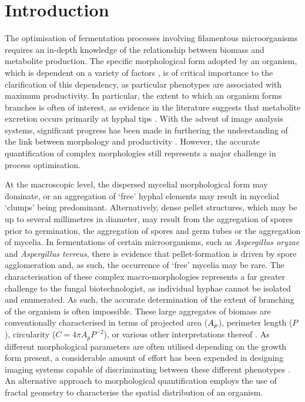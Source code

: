 \section{Introduction}

The optimisation of fermentation processes involving filamentous microorganisms requires an in-depth knowledge of the relationship between biomass and metabolite production. The specific morphological form adopted by an organism, which is dependent on a variety of factors \cite{znidarsic2001}, is of critical importance to the clarification of this dependency, as particular phenotypes are associated with maximum productivity. In particular, the extent to which an organism forms branches is often of interest, as evidence in the literature suggests that metabolite excretion occurs primarily at hyphal tips \cite{gordon2000,muller2002}. With the advent of image analysis systems, significant progress has been made in furthering the understanding of the link between morphology and productivity \cite{papagianni2004}. However, the accurate quantification of complex morphologies still represents a major challenge in process optimisation.

At the macroscopic level, the dispersed mycelial morphological form may dominate, or an aggregation of \lq free' hyphal elements may result in mycelial \lq clumps' being predominant. Alternatively, dense pellet structures, which may be up to several millimetres in diameter, may result from the aggregation of spores prior to germination, the aggregation of spores and germ tubes or the aggregation of mycelia. In fermentations of certain microorganisms, such as \emph{Aspergillus oryzae} and \emph{Aspergillus terreus}, there is evidence that pellet-formation is driven by spore agglomeration \cite{carlsen1996a,bizukojc2009} and, as such, the occurrence of \lq free' mycelia may be rare. The characterisation of these complex macro-morphologies represents a far greater challenge to the fungal biotechnologist, as individual hyphae cannot be isolated and enumerated. As such, the accurate determination of the extent of branching of the organism is often impossible. These large aggregates of biomass are conventionally characterised in terms of projected area ($A_p$), perimeter length ($P$), circularity ($C=4 \pi A_p P^{-2}$), or various other interpretations thereof \cite{papagianni2006a,tucker1992,li2002}. As different morphological parameters are often utilised depending on the growth form present, a considerable amount of effort has been expended in designing imaging systems capable of discriminating between these different phenotypes \cite{papagianni2006a,tucker1992}. An alternative approach to morphological quantification employs the use of fractal geometry to characterise the spatial distribution of an organism.

